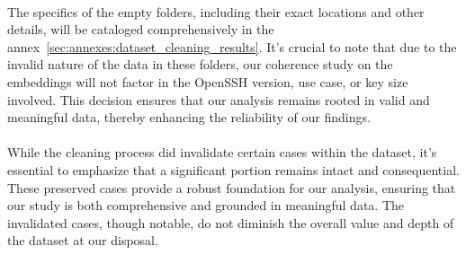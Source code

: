             \paragraph{}The specifics of the empty folders, including their exact locations and other details, will be cataloged comprehensively in the annex~\ref{sec:annexes:dataset_cleaning_results}. It's crucial to note that due to the invalid nature of the data in these folders, our coherence study on the embeddings will not factor in the OpenSSH version, use case, or key size involved. This decision ensures that our analysis remains rooted in valid and meaningful data, thereby enhancing the reliability of our findings.

            \paragraph{}While the cleaning process did invalidate certain cases within the dataset, it's essential to emphasize that a significant portion remains intact and consequential. These preserved cases provide a robust foundation for our analysis, ensuring that our study is both comprehensive and grounded in meaningful data. The invalidated cases, though notable, do not diminish the overall value and depth of the dataset at our disposal.